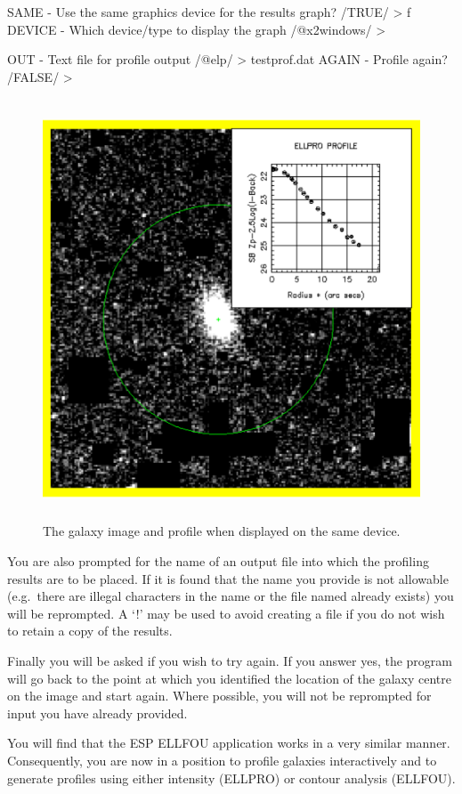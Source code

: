 \documentclass[twoside,11pt]{starlink}
\begin{document}
\begin{terminalv}
SAME - Use the same graphics device for the results graph? /TRUE/ > f
DEVICE - Which device/type to display the graph /@x2windows/ >

OUT - Text file for profile output /@elp/ > testprof.dat
AGAIN - Profile again? /FALSE/ >
\end{terminalv}

\begin{figure}[htlb]
\centering
\includegraphics[height=125mm,width=125mm]{sun180_diag3}
\caption{The galaxy image and profile when displayed on the same device.}
\end{figure}

You are also prompted for the name of an output file into which the
profiling results are to be placed. If it is found that the name you provide is
not allowable (e.g.\ there are illegal characters in the name or the file named
already exists) you will be reprompted. A `!' may be used to avoid creating a
file if you do not wish to retain a copy of the results.

Finally you will be asked if you wish to try again. If you answer yes, the
program will go back to the point at which you identified the location of the
galaxy centre on the image and start again. Where possible, you will not be
reprompted for input you have already provided.

You will find that the ESP ELLFOU application works in a very similar manner.
Consequently, you are now in a position to profile galaxies
interactively and to generate profiles using either intensity (ELLPRO) or
contour analysis (ELLFOU).
\end{document}

